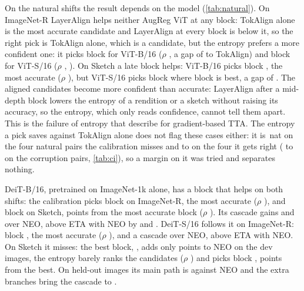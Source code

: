 \documentclass{article}
\newcommand{\tok}{TokAlign}
\newcommand{\layer}{LayerAlign}
\newcommand{\neo}{NEO}
\begin{document}
On the natural shifts the result depends on the model (\cref{tab:natural}). On ImageNet-R \layer{} helps neither AugReg ViT at any block: \tok{} alone is the most accurate candidate and \layer{} at every block is below it, so the right pick is \tok{} alone, which is a candidate, but the entropy prefers a more confident one: it picks block  for ViT-B/16 ($\rho$ , a gap of  to \tok{}) and block  for ViT-S/16 ($\rho$ , ). On Sketch a late block helps: ViT-B/16 picks block , the most accurate ($\rho$ ), but ViT-S/16 picks block  where block  is best, a gap of . The aligned candidates become more confident than accurate: \layer{} after a mid-depth block lowers the entropy of a rendition or a sketch without raising its accuracy, so the entropy, which only reads confidence, cannot tell them apart. This is the failure of entropy that \citet{deyo2024} describe for gradient-based TTA. The entropy a pick saves against \tok{} alone does not flag these cases either: it is \,nat on the four natural pairs the calibration misses and  to  on the four it gets right ( to  on the corruption pairs, \cref{tab:ci}), so a margin on it was tried and separates nothing.

DeiT-B/16, pretrained on ImageNet-1k alone, has a block that helps on both shifts: the calibration picks block  on ImageNet-R, the most accurate ($\rho$ ), and block  on Sketch,  points from the most accurate block ($\rho$ ). Its cascade gains  and  over \neo{}, above ETA with \neo{} by  and . DeiT-S/16 follows it on ImageNet-R: block , the most accurate ($\rho$ ), and a cascade  over \neo{},  above ETA with \neo{}. On Sketch it misses: the best block, , adds only  points to \neo{} on the dev images, the entropy barely ranks the candidates ($\rho$ ) and picks block ,  points from the best. On held-out images its main path is  against \neo{} and the extra branches bring the cascade to .
\end{document}
